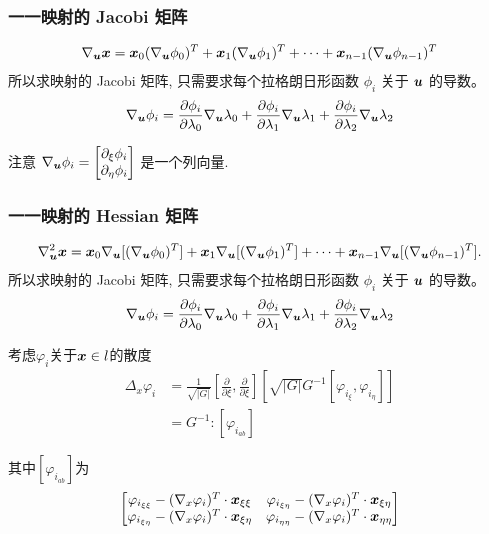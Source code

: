 \documentclass{beamer}
\numberwithin{subsection}{section}
\begin{document}
\begin{frame}
    \frametitle{一一映射的 Jacobi 矩阵}
    \begin{align*}
        \nabla_{\boldsymbol u} {\boldsymbol x} = {\boldsymbol x}_0 (\nabla_{\boldsymbol u} \phi_0)^T + {\boldsymbol x}_1(\nabla_{\boldsymbol u}
        \phi_1)^T
        + \cdots + {\boldsymbol x}_{n-1}(\nabla_{\boldsymbol u} \phi_{n-1})^T
    \end{align*}
    所以求映射的 Jacobi 矩阵, 只需要求每个拉格朗日形函数 $\phi_i$ 关于 ${\boldsymbol u}$ 的导数。
    \begin{align*}
        \nabla_{\boldsymbol u} \phi_i = 
        \frac{\partial \phi_i}{\partial \lambda_0}\nabla_{\boldsymbol u} \lambda_0 + 
        \frac{\partial \phi_i}{\partial \lambda_1}\nabla_{\boldsymbol u} \lambda_1 + 
        \frac{\partial \phi_i}{\partial \lambda_2}\nabla_{\boldsymbol u} \lambda_2 
    \end{align*}
    \begin{remark}
        注意 $\nabla_{\boldsymbol u} \phi_i = \begin{bmatrix} \partial_\xi \phi_i \\
        \partial_\eta \phi_i \end{bmatrix}$ 是一个列向量.
    \end{remark}
\end{frame}

\begin{frame}
    \frametitle{一一映射的 Hessian 矩阵}
    \begin{align*}
        \nabla_{\boldsymbol u}^2 {\boldsymbol x} = {\boldsymbol x}_0 \nabla_{\boldsymbol u}[(\nabla_{\boldsymbol u}     
        \phi_0)^T] +
        {\boldsymbol x}_1\nabla_{\boldsymbol u}[(\nabla_{\boldsymbol u} \phi_1)^T]
        + \cdots + {\boldsymbol x}_{n-1}\nabla_{\boldsymbol u}[(\nabla_{\boldsymbol u}\phi_{n-1})^T].
    \end{align*}
    所以求映射的 Jacobi 矩阵, 只需要求每个拉格朗日形函数 $\phi_i$ 关于 ${\boldsymbol u}$ 的导数。
    \begin{align*}
        \nabla_{\boldsymbol u} \phi_i = 
        \frac{\partial \phi_i}{\partial \lambda_0}\nabla_{\boldsymbol u} \lambda_0 + 
        \frac{\partial \phi_i}{\partial \lambda_1}\nabla_{\boldsymbol u} \lambda_1 + 
        \frac{\partial \phi_i}{\partial \lambda_2}\nabla_{\boldsymbol u} \lambda_2 
    \end{align*}
\end{frame}

\begin{frame}
    考虑$\varphi_i$关于${\boldsymbol x} \in l$的散度
    \begin{align*}
     \Delta_x \varphi_i 
     &=\frac{1}{\sqrt{|G|}}[\frac{\partial}{\partial \xi},\frac{\partial}{\partial \xi}][\sqrt{|G|}G^{-1}[\varphi_{i_\xi},\varphi_{i_\eta}]] \\
     &=G^{-1}:[\varphi_{i_{ab}}]
    \end{align*}

其中$[\varphi_{i_{ab}}]$为
	$$
	\begin{bmatrix}
	\varphi_{i_{\xi\xi}}-(\nabla_x \varphi_i)^T \cdot {\boldsymbol x}_{\xi\xi} &
	\varphi_{i_{\xi\eta}}-(\nabla_x \varphi_i)^T \cdot {\boldsymbol x}_{\xi\eta} \\
	\varphi_{i_{\xi\eta}}-(\nabla_x \varphi_i)^T \cdot {\boldsymbol x}_{\xi\eta} &
	\varphi_{i_{\eta\eta}}-(\nabla_x \varphi_i)^T \cdot {\boldsymbol x}_{\eta\eta} 
	\end{bmatrix}
	$$   
\end{frame}
\end{document}
